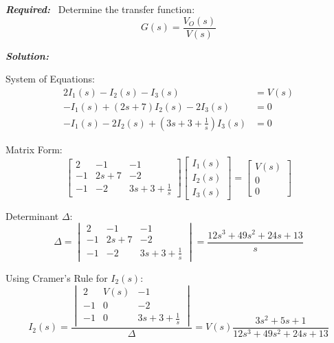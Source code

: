 \documentclass[11pt]{article}
\begin{document}
\vspace{12pt}

\noindent
\textbf{\textit{Required:}}
    \ Determine the transfer function:
    \[
    G(s) = \frac{V_O(s)}{V(s)}
    \]


\bigskip

\noindent\textbf{\textit{Solution:}}

\vspace{12pt}

{System of Equations:}
\[
\begin{aligned}
2I_1(s) - I_2(s) - I_3(s) &= V(s) \\
-I_1(s) + (2s + 7)I_2(s) - 2I_3(s) &= 0 \\
-I_1(s) - 2I_2(s) + \left(3s + 3 + \frac{1}{s}\right)I_3(s) &= 0
\end{aligned}
\]

\bigskip

{Matrix Form:}
\[
\begin{bmatrix}
2 & -1 & -1 \\
-1 & 2s+7 & -2 \\
-1 & -2 & 3s+3+\frac{1}{s}
\end{bmatrix}
\begin{bmatrix}
I_1(s) \\ I_2(s) \\ I_3(s)
\end{bmatrix}
=
\begin{bmatrix}
V(s) \\ 0 \\ 0
\end{bmatrix}
\]

\bigskip

{Determinant \( \Delta \):}
\[
\Delta = 
\begin{vmatrix}
2 & -1 & -1 \\
-1 & 2s+7 & -2 \\
-1 & -2 & 3s+3+\frac{1}{s}
\end{vmatrix}
= \frac{12s^3 + 49s^2 + 24s + 13}{s}
\]

\bigskip

{Using Cramer's Rule for \(I_2(s)\):}
\[
I_2(s) = 
\frac{
\begin{vmatrix}
2 & V(s) & -1 \\
-1 & 0 & -2 \\
-1 & 0 & 3s+3+\frac{1}{s}
\end{vmatrix}
}
{\Delta}
= V(s) \frac{3s^2+5s+1}{12s^3 + 49s^2 + 24s + 13}
\]

\bigskip
\end{document}
